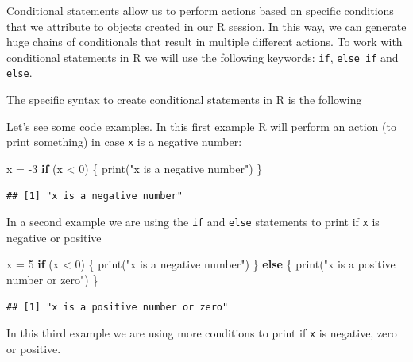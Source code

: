 \documentclass[
]{book}
\newenvironment{Shaded}{\begin{snugshade}}{\end{snugshade}}
\newcommand{\ControlFlowTok}[1]{\textcolor[rgb]{0.13,0.29,0.53}{\textbf{#1}}}
\newcommand{\DecValTok}[1]{\textcolor[rgb]{0.00,0.00,0.81}{#1}}
\newcommand{\FunctionTok}[1]{\textcolor[rgb]{0.00,0.00,0.00}{#1}}
\newcommand{\NormalTok}[1]{#1}
\newcommand{\OtherTok}[1]{\textcolor[rgb]{0.56,0.35,0.01}{#1}}
\newcommand{\SpecialCharTok}[1]{\textcolor[rgb]{0.00,0.00,0.00}{#1}}
\newcommand{\StringTok}[1]{\textcolor[rgb]{0.31,0.60,0.02}{#1}}
\begin{document}
Conditional statements allow us to perform actions based on specific conditions that we attribute to objects created in our R session. In this way, we can generate huge chains of conditionals that result in multiple different actions. To work with conditional statements in R we will use the following keywords: \texttt{if}, \texttt{else\ if} and \texttt{else}.

The specific syntax to create conditional statements in R is the following

Let's see some code examples. In this first example R will perform an action (to print something) in case \texttt{x} is a negative number:

\begin{Shaded}
\begin{Highlighting}[]
\NormalTok{x }\OtherTok{=} \SpecialCharTok{{-}}\DecValTok{3}
\ControlFlowTok{if}\NormalTok{ (x }\SpecialCharTok{\textless{}} \DecValTok{0}\NormalTok{) \{}
  \FunctionTok{print}\NormalTok{(}\StringTok{"x is a negative number"}\NormalTok{)}
\NormalTok{\}}
\end{Highlighting}
\end{Shaded}

\begin{verbatim}
## [1] "x is a negative number"
\end{verbatim}

In a second example we are using the \texttt{if} and \texttt{else} statements to print if \texttt{x} is negative or positive

\begin{Shaded}
\begin{Highlighting}[]
\NormalTok{x }\OtherTok{=} \DecValTok{5}
\ControlFlowTok{if}\NormalTok{ (x }\SpecialCharTok{\textless{}} \DecValTok{0}\NormalTok{) \{}
  \FunctionTok{print}\NormalTok{(}\StringTok{"x is a negative number"}\NormalTok{)}
\NormalTok{\} }\ControlFlowTok{else}\NormalTok{ \{}
  \FunctionTok{print}\NormalTok{(}\StringTok{"x is a positive number or zero"}\NormalTok{)}
\NormalTok{\}}
\end{Highlighting}
\end{Shaded}

\begin{verbatim}
## [1] "x is a positive number or zero"
\end{verbatim}

In this third example we are using more conditions to print if \texttt{x} is negative, zero or positive.
\end{document}
